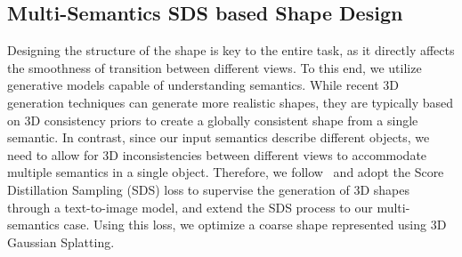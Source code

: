 \subsection{Multi-Semantics SDS based Shape Design}
\label{3_1}
Designing the structure of the shape is key to the entire task, as it directly affects the smoothness of transition between different views. To this end, we utilize generative models capable of understanding semantics. While recent 3D generation techniques can generate more realistic shapes, they are typically based on 3D consistency priors to create a globally consistent shape from a single semantic. In contrast, since our input semantics describe different objects, we need to allow for 3D inconsistencies between different views to accommodate multiple semantics in a single object. Therefore, we follow~\cite{poole2022dreamfusion, wang2023prolificdreamer} and adopt the Score Distillation Sampling (SDS) loss to supervise the generation of 3D shapes through a text-to-image model, and extend the SDS process to our multi-semantics case. Using this loss, we optimize a coarse shape represented using 3D Gaussian Splatting.

